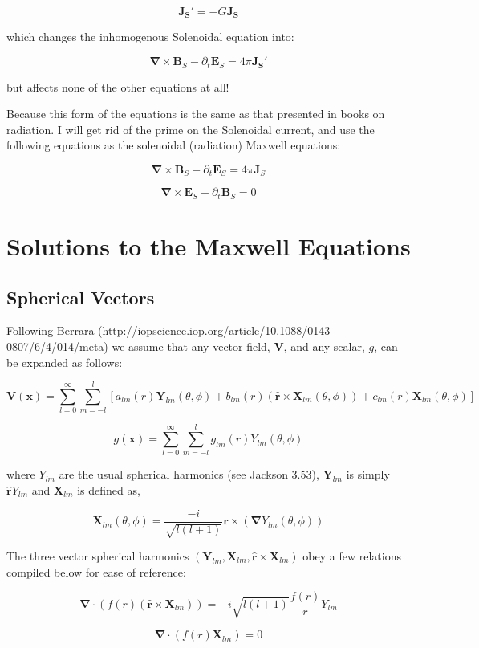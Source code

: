 \documentclass {article}
\renewcommand\vec{\mathbf}
\let\OldS\nabla
\renewcommand{\nabla}{\boldsymbol{\OldS}}
\let\OldHat\hat
\renewcommand{\hat}[1]{\OldHat{\mathbf{#1}}}
\begin{document}
$$\vec {J_S'} = - G \vec {J_S}$$

which changes the inhomogenous Solenoidal equation into:

$$\nabla \times \vec B_S - \partial_t \vec E_S =  4 \pi \vec {J_S'} $$

but affects none of the other equations at all!

Because this form of the equations is the same as that presented in books on radiation. I will get rid of the prime on the Solenoidal current, and use the following equations as the solenoidal (radiation) Maxwell equations:

$$\nabla \times \vec B_S - \partial_t \vec E_S =  4 \pi \vec J_S$$

$$\nabla \times \vec E_S + \partial_t \vec B_S = 0 $$
\newpage

\section{Solutions to the Maxwell Equations}
\subsection{Spherical Vectors}
Following Berrara (http://iopscience.iop.org/article/10.1088/0143-0807/6/4/014/meta) we assume that any vector field, $\vec V$, and any scalar, $g$, can be expanded as follows:

$$\vec V (\vec x) = \sum_{l=0}^{\infty} \sum_{m=-l}^{l} \left[a_{lm}(r) \vec Y_{lm}(\theta, \phi) +b_{lm}(r) \left( \hat r \times \vec X_{lm} (\theta, \phi) \right) +c_{lm}(r) \vec X_{lm} (\theta, \phi) \right] $$

$$g(\vec x) = \sum_{l=0}^{\infty} \sum_{m=-l}^{l} g_{lm}(r) Y_{lm}(\theta, \phi)$$

where $Y_{lm}$ are the usual spherical harmonics (see Jackson 3.53), $\vec Y_{lm}$ is simply $\hat r Y_{lm}$  and $\vec X_{lm}$ is defined as,

$$\vec X_{lm}(\theta, \phi) = \frac {-i}{\sqrt{l(l+1)}} \vec r \times \left( \nabla Y_{lm}(\theta, \phi) \right) $$

The three vector spherical harmonics $(\vec Y_{lm}, \vec X_{lm}, \hat r \times \vec X_{lm} )$ obey a few relations compiled below for ease of reference:

$$\nabla  \cdot \left( f(r) \left( \hat r \times \vec X_{lm} \right) \right) = - i \sqrt {l(l+1)} \frac {f(r)} {r} Y_{lm}$$

$$\nabla \cdot \left( f(r) \vec X_{lm} \right) = 0 $$
\end{document}
